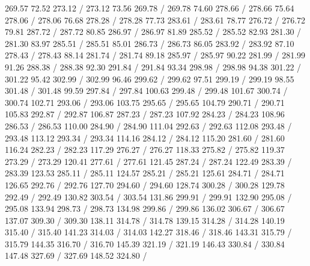 { 269.57 72.52 273.12 /
 273.12 73.56 269.78 /
 269.78 74.60 278.66 /
 278.66 75.64 278.06 /
 278.06 76.68 278.28 /
 278.28 77.73 283.61 /
 283.61 78.77 276.72 /
 276.72 79.81 287.72 /
 287.72 80.85 286.97 /
 286.97 81.89 285.52 /
 285.52 82.93 281.30 /
 281.30 83.97 285.51 /
 285.51 85.01 286.73 /
 286.73 86.05 283.92 /
 283.92 87.10 278.43 /
 278.43 88.14 281.74 /
 281.74 89.18 285.97 /
 285.97 90.22 281.99 /
 281.99 91.26 288.38 /
 288.38 92.30 291.84 /
 291.84 93.34 298.98 /
 298.98 94.38 301.22 /
 301.22 95.42 302.99 /
 302.99 96.46 299.62 /
 299.62 97.51 299.19 /
 299.19 98.55 301.48 /
 301.48 99.59 297.84 /
 297.84 100.63 299.48 /
 299.48 101.67 300.74 /
 300.74 102.71 293.06 /
 293.06 103.75 295.65 /
 295.65 104.79 290.71 /
 290.71 105.83 292.87 /
 292.87 106.87 287.23 /
 287.23 107.92 284.23 /
 284.23 108.96 286.53 /
 286.53 110.00 284.90 /
 284.90 111.04 292.63 /
 292.63 112.08 293.48 /
 293.48 113.12 293.34 /
 293.34 114.16 284.12 /
 284.12 115.20 281.60 /
 281.60 116.24 282.23 /
 282.23 117.29 276.27 /
 276.27 118.33 275.82 /
 275.82 119.37 273.29 /
 273.29 120.41 277.61 /
 277.61 121.45 287.24 /
 287.24 122.49 283.39 /
 283.39 123.53 285.11 /
 285.11 124.57 285.21 /
 285.21 125.61 284.71 /
 284.71 126.65 292.76 /
 292.76 127.70 294.60 /
 294.60 128.74 300.28 /
 300.28 129.78 292.49 /
 292.49 130.82 303.54 /
 303.54 131.86 299.91 /
 299.91 132.90 295.08 /
 295.08 133.94 298.73 /
 298.73 134.98 299.86 /
 299.86 136.02 306.67 /
 306.67 137.07 309.30 /
 309.30 138.11 314.78 /
 314.78 139.15 314.28 /
 314.28 140.19 315.40 /
 315.40 141.23 314.03 /
 314.03 142.27 318.46 /
 318.46 143.31 315.79 /
 315.79 144.35 316.70 /
 316.70 145.39 321.19 /
 321.19 146.43 330.84 /
 330.84 147.48 327.69 /
 327.69 148.52 324.80 /
}
